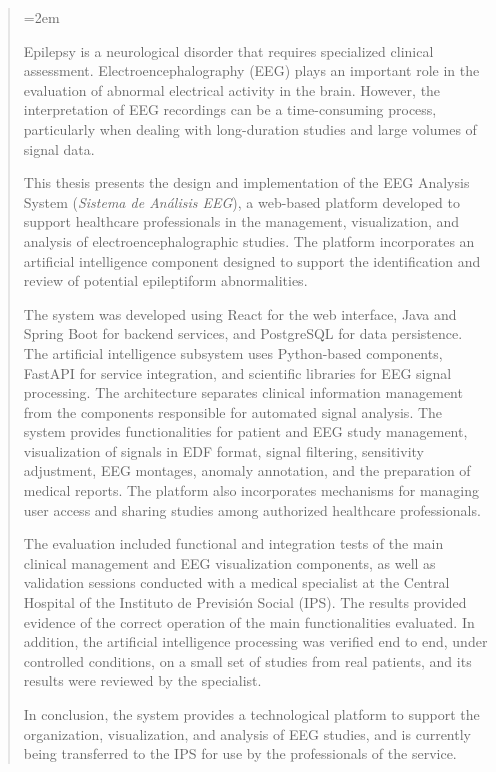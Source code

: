 
\begin{abstract}
\small
\emergencystretch=2em

Epilepsy is a neurological disorder that requires
specialized clinical assessment. Electroencephalography
(EEG) plays an important role in the evaluation of
abnormal electrical activity in the brain. However,
the interpretation of EEG recordings can be a
time-consuming process, particularly when dealing
with long-duration studies and large volumes of
signal data.

This thesis presents the design and implementation of the EEG Analysis System (\textit{Sistema de Análisis EEG}), a web-based platform developed to
support healthcare professionals in the management,
visualization, and analysis of electroencephalographic
studies. The platform incorporates an artificial
intelligence component designed to support the
identification and review of potential epileptiform
abnormalities.

The system was developed using React for the web
interface, Java and Spring Boot for backend services,
and PostgreSQL for data persistence. The artificial
intelligence subsystem uses Python-based components,
FastAPI for service integration, and scientific
libraries for EEG signal processing. The architecture
separates clinical information management from the
components responsible for automated signal analysis. The system provides functionalities for patient and
EEG study management, visualization of signals in
EDF format, signal filtering, sensitivity
adjustment, EEG montages, anomaly annotation, and
the preparation of medical reports. The platform
also incorporates mechanisms for managing user
access and sharing studies among authorized
healthcare professionals.

The evaluation included functional and integration
tests of the main clinical management and EEG
visualization components, as well as validation
sessions conducted with a medical specialist
at the Central Hospital of the Instituto de
Previsión Social (IPS). The results provided
evidence of the correct operation of the main
functionalities evaluated. In addition, the artificial intelligence processing was verified end to end, under controlled conditions, on a small set of studies from real patients, and its results were reviewed by the specialist.

In conclusion, the system provides a technological
platform to support the organization, visualization,
and analysis of EEG studies, and is currently being transferred to the IPS for use by the professionals of the service.

\end{abstract}
